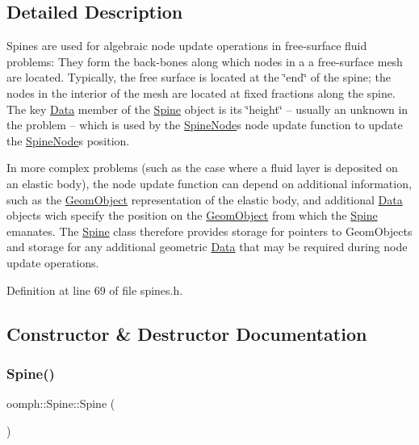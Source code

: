 \subsection{Detailed Description}
Spines are used for algebraic node update operations in free-\/surface fluid problems\+: They form the back-\/bones along which nodes in a a free-\/surface mesh are located. Typically, the free surface is located at the \char`\"{}end\char`\"{} of the spine; the nodes in the interior of the mesh are located at fixed fractions along the spine. The key \hyperlink{classoomph_1_1Data}{Data} member of the \hyperlink{classoomph_1_1Spine}{Spine} object is its \char`\"{}height\char`\"{} -- usually an unknown in the problem -- which is used by the \hyperlink{classoomph_1_1SpineNode}{Spine\+Node}\textquotesingle{}s node update function to update the \hyperlink{classoomph_1_1SpineNode}{Spine\+Node}\textquotesingle{}s position.

In more complex problems (such as the case where a fluid layer is deposited on an elastic body), the node update function can depend on additional information, such as the \hyperlink{classoomph_1_1GeomObject}{Geom\+Object} representation of the elastic body, and additional \hyperlink{classoomph_1_1Data}{Data} objects wich specify the position on the \hyperlink{classoomph_1_1GeomObject}{Geom\+Object} from which the \hyperlink{classoomph_1_1Spine}{Spine} emanates. The \hyperlink{classoomph_1_1Spine}{Spine} class therefore provides storage for pointers to Geom\+Objects and storage for any additional geometric \hyperlink{classoomph_1_1Data}{Data} that may be required during node update operations. 

Definition at line 69 of file spines.\+h.



\subsection{Constructor \& Destructor Documentation}
\mbox{\label{classoomph_1_1Spine_a93fe5032eec46631288d4c098f49e89a}} 
\subsubsection{\texorpdfstring{Spine()}{Spine()}\hspace{0.1cm}{\footnotesize\ttfamily [1/4]}}
{\footnotesize\ttfamily oomph\+::\+Spine\+::\+Spine (\begin{DoxyParamCaption}{ }\end{DoxyParamCaption})\hspace{0.3cm}{\ttfamily [inline]}}



